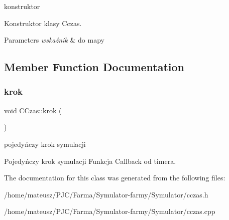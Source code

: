 konstruktor 

Konstruktor klasy Cczas.


\begin{DoxyParams}{Parameters}
{\em wskaźnik} & do mapy \\
\hline
\end{DoxyParams}


\subsection{Member Function Documentation}
\mbox{\label{class_c_czas_af0d9dec535471fd48fee05101ebc6357}} 
\subsubsection{\texorpdfstring{krok}{krok}}
{\footnotesize\ttfamily void C\+Czas\+::krok (\begin{DoxyParamCaption}{ }\end{DoxyParamCaption})\hspace{0.3cm}{\ttfamily [slot]}}



pojedyńczy krok symulacji 

Pojedyńczy krok symulacji Funkcja Callback od timera. 

The documentation for this class was generated from the following files\+:\begin{DoxyCompactItemize}
\item 
/home/mateusz/\+P\+J\+C/\+Farma/\+Symulator-\/farmy/\+Symulator/cczas.\+h\item 
/home/mateusz/\+P\+J\+C/\+Farma/\+Symulator-\/farmy/\+Symulator/cczas.\+cpp\end{DoxyCompactItemize}
